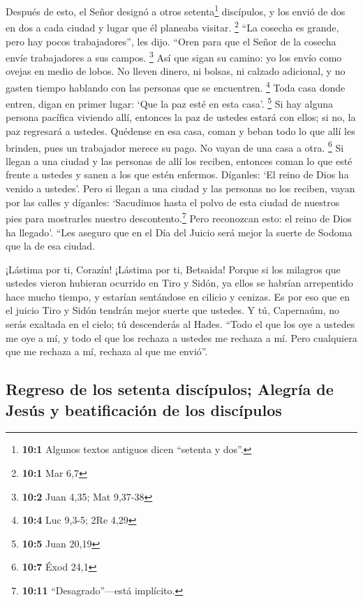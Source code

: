  Después de esto, el Señor designó a otros
setenta\footnote{\textbf{10:1} Algunos textos antiguos dicen ``setenta y
  dos''.} discípulos, y los envió de dos en dos a cada ciudad y lugar
que él planeaba visitar. \footnote{\textbf{10:1} Mar 6,7} 
``La cosecha es grande, pero hay pocos trabajadores'', les dijo. ``Oren
para que el Señor de la cosecha envíe trabajadores a sus campos.
\footnote{\textbf{10:2} Juan 4,35; Mat 9,37-38}  Así que
sigan su camino: yo los envío como ovejas en medio de lobos.
 No lleven dinero, ni bolsas, ni calzado adicional, y no
gasten tiempo hablando con las personas que se encuentren. \footnote{\textbf{10:4}
  Luc 9,3-5; 2Re 4,29}  Toda casa donde entren, digan en
primer lugar: `Que la paz esté en esta casa'. \footnote{\textbf{10:5}
  Juan 20,19}  Si hay alguna persona pacífica viviendo
allí, entonces la paz de ustedes estará con ellos; si no, la paz
regresará a ustedes.  Quédense en esa casa, coman y beban
todo lo que allí les brinden, pues un trabajador merece su pago. No
vayan de una casa a otra. \footnote{\textbf{10:7} Éxod 24,1}
 Si llegan a una ciudad y las personas de allí los
reciben, entonces coman lo que esté frente a ustedes  y
sanen a los que estén enfermos. Díganles: `El reino de Dios ha venido a
ustedes'.  Pero si llegan a una ciudad y las personas no
los reciben, vayan por las calles y díganles:  `Sacudimos
hasta el polvo de esta ciudad de nuestros pies para mostrarles nuestro
descontento.\footnote{\textbf{10:11} ``Desagrado''---está implícito.}
Pero reconozcan esto: el reino de Dios ha llegado'. 
``Les aseguro que en el Día del Juicio será mejor la suerte de Sodoma
que la de esa ciudad.

 ¡Lástima por ti, Corazín! ¡Lástima por ti, Betsaida!
Porque si los milagros que ustedes vieron hubieran ocurrido en Tiro y
Sidón, ya ellos se habrían arrepentido hace mucho tiempo, y estarían
sentándose en cilicio y cenizas.  Es por eso que en el
juicio Tiro y Sidón tendrán mejor suerte que ustedes.  Y
tú, Capernaúm, no serás exaltada en el cielo; tú descenderás al Hades.
 ``Todo el que los oye a ustedes me oye a mí, y todo el
que los rechaza a ustedes me rechaza a mí. Pero cualquiera que me
rechaza a mí, rechaza al que me envió''.

\hypertarget{regreso-de-los-setenta-discuxedpulos-alegruxeda-de-jesuxfas-y-beatificaciuxf3n-de-los-discuxedpulos}{%
\subsection{Regreso de los setenta discípulos; Alegría de Jesús y
beatificación de los
discípulos}\label{regreso-de-los-setenta-discuxedpulos-alegruxeda-de-jesuxfas-y-beatificaciuxf3n-de-los-discuxedpulos}}

